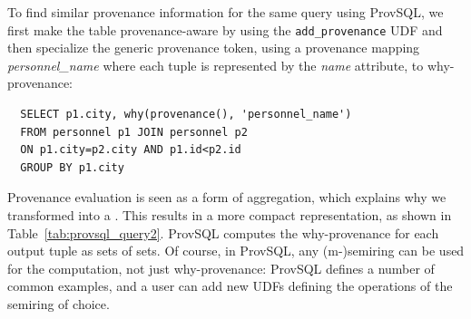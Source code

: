 \begin{toappendix}
To find similar provenance information for the same query using
ProvSQL, we first make the table provenance-aware by using the
\texttt{add_provenance} UDF and then specialize the generic
provenance token, using a provenance mapping \emph{personnel\_name} where each tuple is
represented by the \textit{name} attribute, to why-provenance:
\begin{verbatim}
  SELECT p1.city, why(provenance(), 'personnel_name')
  FROM personnel p1 JOIN personnel p2
  ON p1.city=p2.city AND p1.id<p2.id
  GROUP BY p1.city
\end{verbatim}
Provenance evaluation is seen as a form of aggregation, which explains
why we transformed  into a .
This results in a more compact representation, as shown in Table~\ref{tab:provsql_query2}.
ProvSQL computes the why-provenance for each output tuple as sets of
sets. Of course, in ProvSQL, any (m-)semiring can be used for the
computation, not just why-provenance: ProvSQL defines a number of common
examples, and a user can add new UDFs defining the operations of the
semiring of choice.


\end{toappendix}
